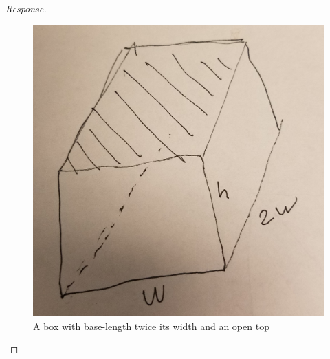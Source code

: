 \documentclass[11pt]{exam}
\begin{document}
\begin{questions}
\begin{proof}[Response]
\begin{figure}[h!]
\begin{centering}
		\includegraphics[scale=.1,angle=270]{shittybox}\caption{A box with base-length twice its width and an open top}\end{centering}
	\end{figure}


\end{proof}
\end{questions}
\end{document}
